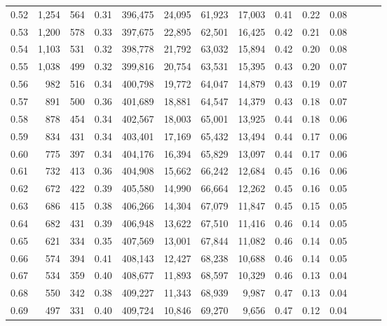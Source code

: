 \begin{tabular}{rrrrrrrrrrrrrr}
0.52 &   1,254 &    564 &  0.31 &  396,475 &   24,095 &  61,923 &  17,003 &  0.41 &  0.22 &      0.08 \\
0.53 &   1,200 &    578 &  0.33 &  397,675 &   22,895 &  62,501 &  16,425 &  0.42 &  0.21 &      0.08 \\
0.54 &   1,103 &    531 &  0.32 &  398,778 &   21,792 &  63,032 &  15,894 &  0.42 &  0.20 &      0.08 \\
0.55 &   1,038 &    499 &  0.32 &  399,816 &   20,754 &  63,531 &  15,395 &  0.43 &  0.20 &      0.07 \\
0.56 &     982 &    516 &  0.34 &  400,798 &   19,772 &  64,047 &  14,879 &  0.43 &  0.19 &      0.07 \\
0.57 &     891 &    500 &  0.36 &  401,689 &   18,881 &  64,547 &  14,379 &  0.43 &  0.18 &      0.07 \\
0.58 &     878 &    454 &  0.34 &  402,567 &   18,003 &  65,001 &  13,925 &  0.44 &  0.18 &      0.06 \\
0.59 &     834 &    431 &  0.34 &  403,401 &   17,169 &  65,432 &  13,494 &  0.44 &  0.17 &      0.06 \\
0.60 &     775 &    397 &  0.34 &  404,176 &   16,394 &  65,829 &  13,097 &  0.44 &  0.17 &      0.06 \\
0.61 &     732 &    413 &  0.36 &  404,908 &   15,662 &  66,242 &  12,684 &  0.45 &  0.16 &      0.06 \\
0.62 &     672 &    422 &  0.39 &  405,580 &   14,990 &  66,664 &  12,262 &  0.45 &  0.16 &      0.05 \\
0.63 &     686 &    415 &  0.38 &  406,266 &   14,304 &  67,079 &  11,847 &  0.45 &  0.15 &      0.05 \\
0.64 &     682 &    431 &  0.39 &  406,948 &   13,622 &  67,510 &  11,416 &  0.46 &  0.14 &      0.05 \\
0.65 &     621 &    334 &  0.35 &  407,569 &   13,001 &  67,844 &  11,082 &  0.46 &  0.14 &      0.05 \\
0.66 &     574 &    394 &  0.41 &  408,143 &   12,427 &  68,238 &  10,688 &  0.46 &  0.14 &      0.05 \\
0.67 &     534 &    359 &  0.40 &  408,677 &   11,893 &  68,597 &  10,329 &  0.46 &  0.13 &      0.04 \\
0.68 &     550 &    342 &  0.38 &  409,227 &   11,343 &  68,939 &   9,987 &  0.47 &  0.13 &      0.04 \\
0.69 &     497 &    331 &  0.40 &  409,724 &   10,846 &  69,270 &   9,656 &  0.47 &  0.12 &      0.04 \\

\end{tabular}
